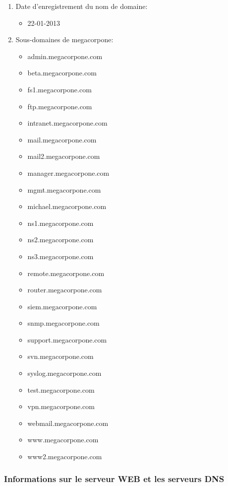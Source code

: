 \documentclass[french,oneside]{article}
\begin{document}
\begin{enumerate}
    \item Date d'enregistrement du nom de domaine:
    \begin{itemize}
        \item 22-01-2013
    \end{itemize}
    \item Sous-domaines de megacorpone:
    \begin{itemize}
        \item admin.megacorpone.com
        \item beta.megacorpone.com
        \item fs1.megacorpone.com
        \item ftp.megacorpone.com
        \item intranet.megacorpone.com
        \item mail.megacorpone.com
        \item mail2.megacorpone.com
        \item manager.megacorpone.com
        \item mgmt.megacorpone.com
        \item michael.megacorpone.com
        \item ns1.megacorpone.com
        \item ns2.megacorpone.com
        \item ns3.megacorpone.com
        \item remote.megacorpone.com
        \item router.megacorpone.com
        \item siem.megacorpone.com
        \item snmp.megacorpone.com
        \item support.megacorpone.com
        \item svn.megacorpone.com
        \item syslog.megacorpone.com
        \item test.megacorpone.com
        \item vpn.megacorpone.com
        \item webmail.megacorpone.com
        \item www.megacorpone.com
        \item www2.megacorpone.com
    \end{itemize}
\end{enumerate}



\subsubsection{Informations sur le serveur WEB et les serveurs DNS}
\end{document}
